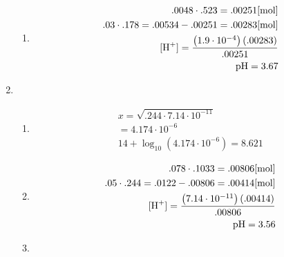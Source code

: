 \documentclass[12pt]{article}
\begin{document}
\begin{enumerate}
\begin{enumerate}
      \item 

    \begin{equation}
      \begin{split}
        .0048\cdot.523=.00251[\si{\mole}]\\
        .03\cdot.178=.00534-.00251=.00283[\si{\mole}]\\
        [\ce{H+}]=\frac{\left(1.9\cdot10^{-4}\right)\left( .00283 \right)}{.00251}\\
        \ce{pH}=3.67
      \end{split}
      \label{14}
    \end{equation}

    \end{enumerate}

  \item

    \begin{enumerate}

      \item 

    \begin{equation}
      \begin{split}
        x=\sqrt{.244\cdot7.14\cdot10^{-11}}\\
        =4.174\cdot10^{-6}\\
        14+\log_{10}\left( 4.174\cdot10^{-6}  \right)=8.621
      \end{split}
      \label{15}
    \end{equation}

      \item 

    \begin{equation}
      \begin{split}
        .078\cdot.1033=.00806[\si{\mole}]\\
        .05\cdot.244=.0122-.00806=.00414[\si{\mole}]\\
        [\ce{H+}]=\frac{\left( 7.14\cdot10^{-11} \right)\left( .00414 \right)}{.00806}\\
        \ce{pH}=3.56
      \end{split}
      \label{16}
    \end{equation}

      \item 


\end{enumerate}
\end{enumerate}
\end{document}
